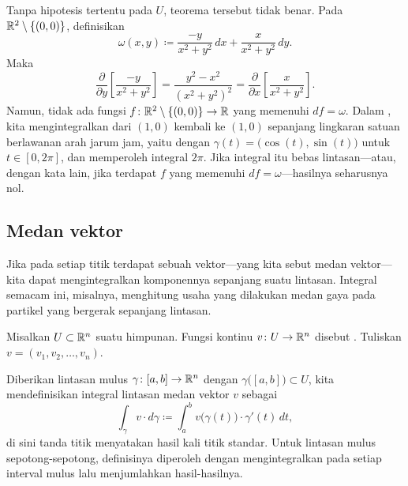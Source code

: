 \begin{example}
Tanpa hipotesis tertentu pada $U$, teorema tersebut tidak benar. Pada
${\mathbb{R}}^2 \setminus \{ (0,0) \}$, definisikan
\begin{equation*}
\omega(x,y) \coloneqq \frac{-y}{x^2+y^2} \,dx + \frac{x}{x^2+y^2} \,dy .
\end{equation*}
Maka
\begin{equation*}
\frac{\partial}{\partial y} \left[ 
\frac{-y}{x^2+y^2} \right] =
\frac{y^2-x^2}{{(x^2+y^2)}^2}
=
\frac{\partial}{\partial x} \left[ 
\frac{x}{x^2+y^2} \right] .
\end{equation*}
Namun, tidak ada fungsi
$f \colon {\mathbb{R}}^2 \setminus \{ (0,0) \} \to {\mathbb{R}}$ yang memenuhi $df = \omega$.
Dalam , kita mengintegralkan dari
$(1,0)$ kembali ke $(1,0)$ sepanjang lingkaran satuan berlawanan arah jarum
jam, yaitu dengan
$\gamma(t) = \bigl(\cos(t),\sin(t)\bigr)$ untuk $t \in [0,2\pi]$, dan
memperoleh integral $2\pi$. Jika integral itu bebas lintasan---atau, dengan kata
lain, jika terdapat $f$ yang memenuhi $df = \omega$---hasilnya seharusnya nol.
\end{example}

\subsection{Medan vektor}

Jika pada setiap titik terdapat sebuah vektor---yang kita sebut medan
vektor---kita dapat mengintegralkan komponennya sepanjang suatu lintasan.
Integral semacam ini, misalnya, menghitung usaha yang dilakukan medan gaya pada
partikel yang bergerak sepanjang lintasan.

\begin{defn}
Misalkan $U \subset {\mathbb{R}}^n$ suatu himpunan. Fungsi kontinu
$v \colon U \to {\mathbb{R}}^n$ disebut \emph{}. Tuliskan
$v = (v_1,v_2,\ldots,v_n)$.

Diberikan lintasan mulus $\gamma \colon [a,b] \to {\mathbb{R}}^n$ dengan
$\gamma\bigl([a,b]\bigr) \subset U$, kita mendefinisikan integral lintasan
medan vektor $v$ sebagai
\begin{equation*}
\int_{\gamma} v \cdot d\gamma
\coloneqq
\int_a^b v\bigl(\gamma(t)\bigr) \cdot \gamma'(t) \, dt ,
\end{equation*}
di sini tanda titik menyatakan hasil kali titik standar. Untuk lintasan mulus
sepotong-sepotong, definisinya diperoleh dengan mengintegralkan pada setiap
interval mulus lalu menjumlahkan hasil-hasilnya.
\end{defn}

